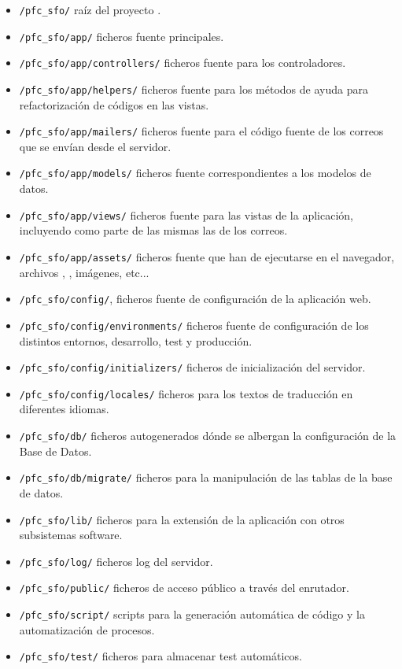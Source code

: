 \begin{itemize}
\item \texttt{/pfc\_sfo/} raíz del proyecto .
\item \texttt{/pfc\_sfo/app/} ficheros fuente principales.
\item \texttt{/pfc\_sfo/app/controllers/} ficheros fuente para los
  controladores.
\item \texttt{/pfc\_sfo/app/helpers/} ficheros fuente para los métodos de ayuda
  para refactorización de códigos en las vistas.
\item \texttt{/pfc\_sfo/app/mailers/} ficheros fuente para el código fuente de
  los correos que se envían desde el servidor.
\item \texttt{/pfc\_sfo/app/models/} ficheros fuente correspondientes a los
  modelos de datos.
\item \texttt{/pfc\_sfo/app/views/} ficheros fuente para las vistas de la
  aplicación, incluyendo como parte de las mismas las de los correos.
\item \texttt{/pfc\_sfo/app/assets/} ficheros fuente que han de ejecutarse en
  el navegador, archivos , , imágenes, etc...
\item \texttt{/pfc\_sfo/config/}, ficheros fuente de configuración de la
  aplicación web.
\item \texttt{/pfc\_sfo/config/environments/} ficheros fuente de configuración
  de los distintos entornos, desarrollo, test y producción.
\item \texttt{/pfc\_sfo/config/initializers/} ficheros de inicialización del
  servidor.
\item \texttt{/pfc\_sfo/config/locales/} ficheros  para los
  textos de traducción en diferentes idiomas.
\item \texttt{/pfc\_sfo/db/} ficheros autogenerados dónde se albergan la
  configuración de la Base de Datos.
\item \texttt{/pfc\_sfo/db/migrate/} ficheros para la manipulación de las
  tablas de la base de datos.
\item \texttt{/pfc\_sfo/lib/} ficheros para la extensión de la aplicación con
  otros subsistemas software.
\item \texttt{/pfc\_sfo/log/} ficheros log del servidor.
\item \texttt{/pfc\_sfo/public/} ficheros de acceso público a través del
  enrutador.
\item \texttt{/pfc\_sfo/script/} scripts para la generación automática de
  código y la automatización de procesos.
\item \texttt{/pfc\_sfo/test/} ficheros para almacenar test automáticos.
\end{itemize}

